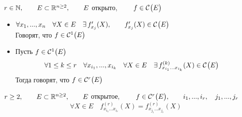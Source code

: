 \begin{definition}
	$ r \in \N, \qquad E \sub \R^{n \ge 2}, \qquad E $ открыто, $ \qquad f \in \Cont{E} $
	\begin{itemize}
		\item $ \forall x_1, ..., x_n \quad \forall X \in E \quad \exist f_{x_j}'(X), \qquad f_{x_j}'(X) \in \Cont{E} $ \\
		Говорят, что $ f \in \Cont[1]E $
		\item Пусть $ f \in \Cont[1]{E} $
		$$ \forall 1 \le k \le r \quad \forall x_{i_1}, ..., x_{i_k} \quad \forall X \in E \quad \exist f_{x_{i_1} \dots x_{i_k}}^{(k)}(X) \in \Cont{E} $$
		Тогда говорят, что $ f \in \Cont[r]{E} $
	\end{itemize}
\end{definition}

\begin{theorem}
	$ r \ge 2, \qquad E \sub \R^{n \ge 2}, \qquad E $ открытое, $ \qquad f \in \Cont[r]{E}, \qquad i_1, ..., i_r, \quad j_1, ..., j_r $
	$$ \forall X \in E \quad f_{x_{i_1}...x_{i_r}}^{(r)}(X) = f_{x_{j_1}...x_{j_r}}^{(r)}(X) $$
\end{theorem}


